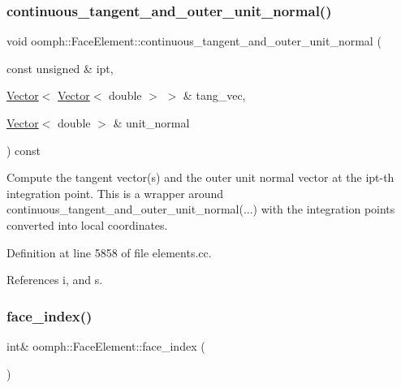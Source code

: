 \subsubsection{\texorpdfstring{continuous\+\_\+tangent\+\_\+and\+\_\+outer\+\_\+unit\+\_\+normal()}{continuous\_tangent\_and\_outer\_unit\_normal()}\hspace{0.1cm}{\footnotesize\ttfamily [2/2]}}
{\footnotesize\ttfamily void oomph\+::\+Face\+Element\+::continuous\+\_\+tangent\+\_\+and\+\_\+outer\+\_\+unit\+\_\+normal (\begin{DoxyParamCaption}\item[{const unsigned \&}]{ipt,  }\item[{\hyperlink{classoomph_1_1Vector}{Vector}$<$ \hyperlink{classoomph_1_1Vector}{Vector}$<$ double $>$ $>$ \&}]{tang\+\_\+vec,  }\item[{\hyperlink{classoomph_1_1Vector}{Vector}$<$ double $>$ \&}]{unit\+\_\+normal }\end{DoxyParamCaption}) const}



Compute the tangent vector(s) and the outer unit normal vector at the ipt-\/th integration point. This is a wrapper around continuous\+\_\+tangent\+\_\+and\+\_\+outer\+\_\+unit\+\_\+normal(...) with the integration points converted into local coordinates. 



Definition at line 5858 of file elements.\+cc.



References i, and s.

\mbox{\label{classoomph_1_1FaceElement_a478d577ac6db67ecc80f1f02ae3ab170}} 
\subsubsection{\texorpdfstring{face\+\_\+index()}{face\_index()}\hspace{0.1cm}{\footnotesize\ttfamily [1/2]}}
{\footnotesize\ttfamily int\& oomph\+::\+Face\+Element\+::face\+\_\+index (\begin{DoxyParamCaption}{ }\end{DoxyParamCaption})\hspace{0.3cm}{\ttfamily [inline]}}



